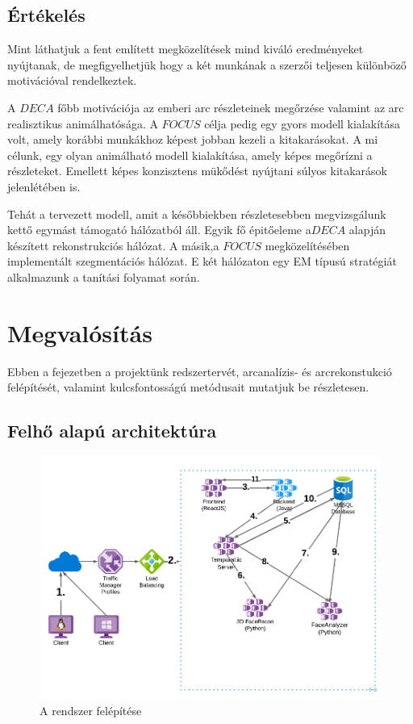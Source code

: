 \documentclass[12pt,a4]{article}
\begin{document}
 	      \subsection{Értékelés}

            Mint láthatjuk a fent említett megközelítések mind kiváló eredményeket nyújtanak, de megfigyelhetjük hogy a két munkának a szerzői teljesen különböző motivációval rendelkeztek.
            
         	A $DECA$ főbb motivációja az emberi arc részleteinek megőrzése valamint az arc realisztikus animálhatósága. A $FOCUS$ célja pedig egy gyors modell kialakítása volt, amely korábbi munkákhoz képest jobban kezeli a kitakarásokat. A mi célunk, egy olyan animálható modell kialakítása, amely képes megőrízni a részleteket. Emellett képes konzisztens mükődést nyújtani súlyos kitakarások jelenlétében is.
 	
 	          Tehát a tervezett modell, amit a későbbiekben részletesebben
 	          megvizsgálunk kettő egymást támogató hálózatból áll. Egyik fő 
            épitőeleme a$DECA$ alapján készített rekonstrukciós hálózat. A másik,a $FOCUS$ megközelítésében implementált szegmentációs hálózat. E két hálózaton egy EM típusú stratégiát alkalmazunk a tanítási folyamat során.

            
    \section{Megvalósítás}
    
        Ebben a fejezetben a projektünk redszertervét, arcanalízis- és arcrekonstukció felépítését, valamint kulcsfontosságú metódusait mutatjuk be részletesen.
        
        \subsection{Felhő alapú architektúra}
        
            \begin{figure}[h]	
        		\centering
        		\includegraphics[width=1\linewidth]{sysplan}
        		\caption{ A rendszer felépítése}
        	    \label{fig:sysplan}
            \end{figure}
\end{document}
